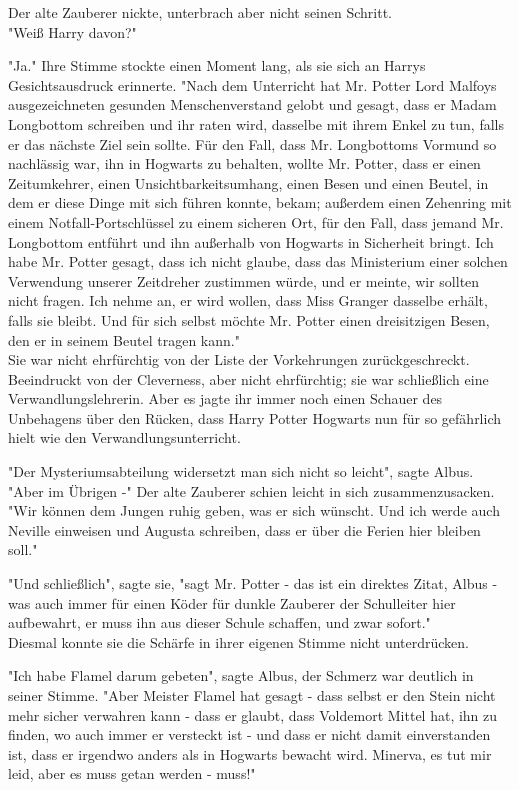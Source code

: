 {Der alte Zauberer nickte, unterbrach aber nicht seinen Schritt.\\ "Weiß Harry davon?"

"Ja." Ihre Stimme stockte einen Moment lang, als sie sich an Harrys Gesichtsausdruck erinnerte. "Nach dem Unterricht hat Mr. Potter Lord Malfoys ausgezeichneten gesunden Menschenverstand gelobt und gesagt, dass er Madam Longbottom schreiben und ihr raten wird, dasselbe mit ihrem Enkel zu tun, falls er das nächste Ziel sein sollte. Für den Fall, dass Mr. Longbottoms Vormund so nachlässig war, ihn in Hogwarts zu behalten, wollte Mr. Potter, dass er einen Zeitumkehrer, einen Unsichtbarkeitsumhang, einen Besen und einen Beutel, in dem er diese Dinge mit sich führen konnte, bekam; außerdem einen Zehenring mit einem Notfall-Portschlüssel zu einem sicheren Ort, für den Fall, dass jemand Mr. Longbottom entführt und ihn außerhalb von Hogwarts in Sicherheit bringt. Ich habe Mr. Potter gesagt, dass ich nicht glaube, dass das Ministerium einer solchen Verwendung unserer Zeitdreher zustimmen würde, und er meinte, wir sollten nicht fragen. Ich nehme an, er wird wollen, dass Miss Granger dasselbe erhält, falls sie bleibt. Und für sich selbst möchte Mr. Potter einen dreisitzigen Besen, den er in seinem Beutel tragen kann."\\ Sie war nicht ehrfürchtig von der Liste der Vorkehrungen zurückgeschreckt. Beeindruckt von der Cleverness, aber nicht ehrfürchtig; sie war schließlich eine Verwandlungslehrerin. Aber es jagte ihr immer noch einen Schauer des Unbehagens über den Rücken, dass Harry Potter Hogwarts nun für so gefährlich hielt wie den Verwandlungsunterricht.

"Der Mysteriumsabteilung widersetzt man sich nicht so leicht", sagte Albus. "Aber im Übrigen -" Der alte Zauberer schien leicht in sich zusammenzusacken. "Wir können dem Jungen ruhig geben, was er sich wünscht. Und ich werde auch Neville einweisen und Augusta schreiben, dass er über die Ferien hier bleiben soll."

"Und schließlich", sagte sie, "sagt Mr. Potter - das ist ein direktes Zitat, Albus - was auch immer für einen Köder für dunkle Zauberer der Schulleiter hier aufbewahrt, er muss ihn aus dieser Schule schaffen, und zwar sofort."\\ Diesmal konnte sie die Schärfe in ihrer eigenen Stimme nicht unterdrücken.

"Ich habe Flamel darum gebeten", sagte Albus, der Schmerz war deutlich in seiner Stimme. "Aber Meister Flamel hat gesagt - dass selbst er den Stein nicht mehr sicher verwahren kann - dass er glaubt, dass Voldemort Mittel hat, ihn zu finden, wo auch immer er versteckt ist - und dass er nicht damit einverstanden ist, dass er irgendwo anders als in Hogwarts bewacht wird. Minerva, es tut mir leid, aber es muss getan werden - muss!"

}
